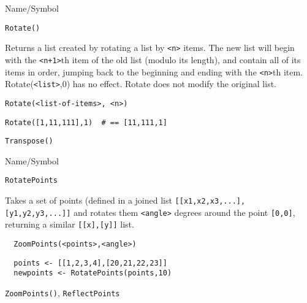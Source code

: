 \rl


\begin{desc}{Name/Symbol}
\item[Name/Symbol]	\verb+Rotate()+

\item[Description] 	Returns a list created by rotating a list by \verb!<n>! items.  
		The new list will begin with the \verb!<n+1>!th item of the old 
		list (modulo its length), and contain all of its items in 
		order, jumping back to the beginning and ending with the \verb!<n>!th
		item. Rotate(\verb!<list>!,0) has no effect.  Rotate does not modify 
		the original list.

\item[Usage]
\begin{verbatim}
Rotate(<list-of-items>, <n>)
\end{verbatim}

\item[Example]     	
\begin{verbatim}
Rotate([1,11,111],1)  # == [11,111,1]
\end{verbatim}

\item[See Also]    	\verb+Transpose()+
\end{desc}

\rl



\begin{desc}{Name/Symbol}
\item[Name/Symbol]	\verb+RotatePoints+

\item[Description]  Takes a set of points (defined in a joined list 
\verb+[[x1,x2,x3,...],+ \verb+[y1,y2,y3,...]]+ and rotates them \verb+<angle>+ degrees
around the point \verb+[0,0]+,  returning a similar \verb+[[x],[y]]+ list.

\item[Usage]
\begin{verbatim}
  ZoomPoints(<points>,<angle>)
\end{verbatim}

\item[Example] 
\begin{verbatim}
  points <- [[1,2,3,4],[20,21,22,23]]
  newpoints <- RotatePoints(points,10)
\end{verbatim}

\item[See Also] \verb+ZoomPoints()+, \verb+ReflectPoints+
\end{desc}

